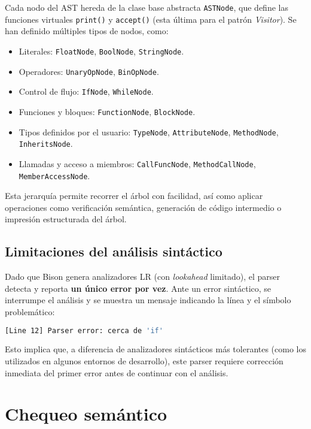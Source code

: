 \documentclass{llncs}
\begin{document}
	Cada nodo del AST hereda de la clase base abstracta \texttt{ASTNode}, que define las funciones virtuales \texttt{print()} y \texttt{accept()} (esta última para el patrón \textit{Visitor}). Se han definido múltiples tipos de nodos, como:

	\begin{itemize}
		\item Literales: \texttt{FloatNode}, \texttt{BoolNode}, \texttt{StringNode}.
		\item Operadores: \texttt{UnaryOpNode}, \texttt{BinOpNode}.
		\item Control de flujo: \texttt{IfNode}, \texttt{WhileNode}.
		\item Funciones y bloques: \texttt{FunctionNode}, \texttt{BlockNode}.
		\item Tipos definidos por el usuario: \texttt{TypeNode}, \texttt{AttributeNode}, \texttt{MethodNode}, \texttt{InheritsNode}.
		\item Llamadas y acceso a miembros: \texttt{CallFuncNode}, \texttt{MethodCallNode}, \texttt{MemberAccessNode}.
	\end{itemize}

	Esta jerarquía permite recorrer el árbol con facilidad, así como aplicar operaciones como verificación semántica, generación de código intermedio o impresión estructurada del árbol.

	\subsection{Limitaciones del análisis sintáctico}

	Dado que Bison genera analizadores LR (con \textit{lookahead} limitado), el parser detecta y reporta \textbf{un único error por vez}. Ante un error sintáctico, se interrumpe el análisis y se muestra un mensaje indicando la línea y el símbolo problemático:

	\begin{lstlisting}[language=bash]
	[Line 12] Parser error: cerca de 'if'
	\end{lstlisting}

	Esto implica que, a diferencia de analizadores sintácticos más tolerantes (como los utilizados en algunos entornos de desarrollo), este parser requiere corrección inmediata del primer error antes de continuar con el análisis.

	\section{Chequeo semántico}
\end{document}
